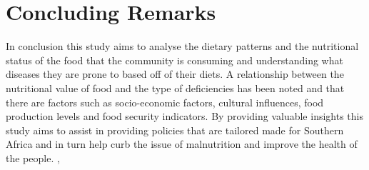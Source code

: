 \documentclass[a4paper,11pt]{report}
\begin{document}
	\section{Concluding Remarks}
In conclusion this study aims to analyse the dietary patterns and the nutritional status of the food that the community is consuming and understanding what diseases they are prone to based off of their diets. A relationship between the nutritional value of food and the type of deficiencies has been noted and that there are factors such as socio-economic factors, cultural influences, food production levels and food security indicators. By providing valuable insights this study aims to assist in providing policies that are tailored made for Southern Africa and in turn help curb the issue of malnutrition and improve the health of the people.
	,
	
\end{document}
